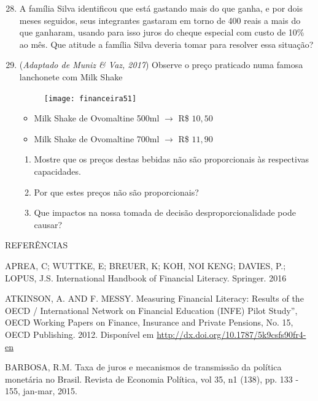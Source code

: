 \begin{enumerate}\setcounter{enumi}{27}
\item A família Silva identificou que está gastando mais do que ganha, e por dois meses seguidos, seus integrantes gastaram em torno de 400 reais a mais do que ganharam, usando para isso juros do cheque especial com custo de 10\% ao mês. Que atitude a família Silva deveria tomar para resolver essa situação? 

\item (\textit{Adaptado de Muniz \& Vaz, 2017}) Observe o preço praticado numa famosa lanchonete com Milk Shake

\begin{figure}[H]
\centering

\texttt{[image: financeira51]}
\end{figure}

\begin{itemize}
  \item Milk Shake de Ovomaltine 500ml $\rightarrow$ R\$ $10{,}50$
  \item Milk Shake de Ovomaltine 700ml $\rightarrow$ R\$ $11{,}90$
\end{itemize}

\begin{enumerate}
  \item Mostre que os preços destas bebidas não são proporcionais às respectivas capacidades.
  \item Por que estes preços não são proporcionais?
  \item Que impactos na nossa tomada de decisão desproporcionalidade pode causar?
\end{enumerate}


\end{enumerate}

REFERÊNCIAS

APREA, C; WUTTKE, E; BREUER, K; KOH, NOI KENG; DAVIES, P.; LOPUS, J.S. International Handbook of Financial Literacy. Springer. 2016

ATKINSON, A. AND F. MESSY. Measuring Financial Literacy: Results of the OECD / International Network on Financial Education (INFE) Pilot Study”, OECD Working Papers on Finance, Insurance and Private Pensions, No. 15, OECD Publishing. 2012. Disponível em \url{http://dx.doi.org/10.1787/5k9csfs90fr4-en}

BARBOSA, R.M. Taxa de juros e mecanismos de transmissão da política monetária no Brasil. Revista de Economia Política, vol 35, n1 (138), pp. 133 - 155, jan-mar, 2015.

